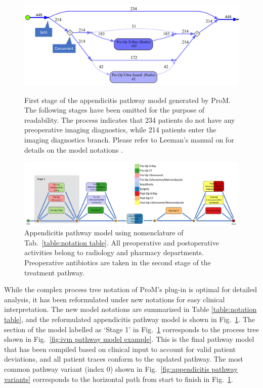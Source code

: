 \begin{figure}[t]
\includegraphics[width=\textwidth]{images/ivm_appendicitis_first_stage_example.png}
\caption{First stage of the appendicitis pathway model generated by
  ProM. The following stages have been omitted for the purpose of
  readability.
  The process indicates that 234 patients do not have any preoperative
  imaging diagnostics, while 214 patients enter the imaging
  diagnostics branch.
  Please refer to Leeman's manual on  for details on the model notations \cite{leemansinductive}.}
\label{fig:ivm pathway model example}

\includegraphics[width=\textwidth]{images/communicative_appendicitis_process_models_anes.jpg}
\caption{Appendicitis pathway model using nomenclature of Tab.~\ref{table:notation table}. All preoperative and
  postoperative activities belong to radiology and pharmacy
  departments. Preoperative antibiotics are taken in the second stage
  of the treatment pathway.}
\label{fig:appendicitis pathway model}
\end{figure}

While the complex process tree notation of ProM's  plug-in is optimal for detailed analysis, it has been
reformulated under new notations for easy clinical interpretation.
The new model notations are summarized in Table \ref{table:notation
  table}, and the reformulated appendicitis pathway model is shown in
Fig.~\ref{fig:appendicitis pathway model}. The section of the model
labelled as `Stage 1' in Fig.~\ref{fig:appendicitis pathway model}
corresponds to the process tree shown in Fig.~\ref{fig:ivm pathway
  model example}.
This is the final pathway model that has been compiled based on
clinical input to account for valid patient deviations, and all
patient traces conform to the updated pathway.
The most common pathway variant (index 0) shown in Fig.~\ref{fig:appendicitis pathway variants} corresponds to the horizontal path from start to finish in Fig.~\ref{fig:appendicitis pathway model}.

